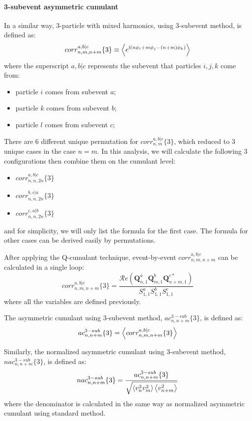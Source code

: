 \paragraph{3-subevent asymmetric cumulant}
In a similar way, 3-particle with mixed harmonics, using 3-subevent method, is defined as:
\begin{equation}
corr_{n,m,n+m}^{a,b|c}\{3\}\equiv\left\langle e^{\text{i}(n\phi_i+m\phi_j-(n+m)\phi_k)}\right\rangle
\end{equation}
where the superscript $a,b|c$ represents the subevent that particles $i,j,k$ come from:
\begin{itemize}
\item particle $i$ comes from subevent $a$;
\item particle $k$ comes from subevent $b$;
\item particle $l$ comes from subevent $c$;
\end{itemize}

There are 6 different unique permutation for $corr_{n,m}^{a,b|c}\{3\}$, which reduced to 3 unique cases in the case $n=m$. In this analysis, we will calculate the following 3 configurations then combine them on the cumulant level:
\begin{itemize}
\item $corr_{n,n,2n}^{a,b|c}\{3\}$
\item $corr_{n,n,2n}^{b,c|a}\{3\}$
\item $corr_{n,n,2n}^{c,a|b}\{3\}$
\end{itemize}
and for simplicity, we will only list the formula for the first case. The formula for other cases can be derived easily by permutations.

After applying the Q-cumulant technique, event-by-event $corr_{n,m,n+m}^{a,b|c}$ can be calculated in a single loop:
\begin{equation}
corr_{n,m,n+m}^{a,b|c}\{3\} = \frac{\mathcal{R}\textit{e}(\pmb{Q}_{n,1}^a\pmb{Q}_{m,1}^b\pmb{Q}_{n+m,1}^{c*})}{S_{1,1}^a S_{1,1}^b S_{1,1}^c}
\end{equation}
where all the variables are defined previously.

The asymmetric cumulant using 3-subevent method, $ac_{n,n+m}^{3-sub}\{3\}$, is defined as:
\begin{equation}
ac_{n,n+m}^{3-sub}\{3\} = \left\langle corr_{n,m,n+m}^{a,b|c}\{3\}\right\rangle
\end{equation}

Similarly, the normalized asymmetric cumulant using 3-subevent method, $nac_{n,n+m}^{3-sub}\{3\}$, is defined as:
\begin{equation}
nac_{n,n+m}^{3-sub}\{3\} = \frac{ac_{n,n+m}^{3-sub}\{3\}}{\sqrt{\left\langle v_n^2 v_m^2\right\rangle\left\langle v_{n+m}^2\right\rangle}}
\end{equation}
where the denominator is calculated in the same way as normalized asymmetric cumulant using standard method.



